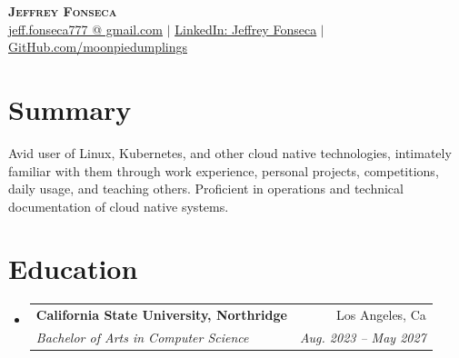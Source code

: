 \documentclass[letterpaper,11pt]{article}
\makeatletter
\newcommand{\resumeSubheading}[4]{
  \vspace{-2pt}\item
    \begin{tabular*}{0.97\textwidth}[t]{l@{\extracolsep{\fill}}r}
      \textbf{#1} & #2 \\
      \textit{\small#3} & \textit{\small #4} \\
    \end{tabular*}\vspace{-7pt}
}
\newcommand{\resumeSubHeadingListStart}{\begin{itemize}[leftmargin=0.15in, label={}]}
\newcommand{\resumeSubHeadingListEnd}{\end{itemize}}
\makeatother
\begin{document}

\begin{center}
    \textbf{\Huge \scshape Jeffrey Fonseca} \\ \vspace{1pt}
    \small \href{mailto:jeff.fonseca777 [at] gmail.com}{\underline{jeff.fonseca777 @ gmail.com}} $|$
    \href{https://www.linkedin.com/in/jeffrey-fonseca-4242521a4/}{\underline{LinkedIn: Jeffrey Fonseca}} $|$
    \href{https://github.com/moonpiedumplings}{\underline{GitHub.com/moonpiedumplings}}
\end{center}

\section{Summary}

\small{Avid user of Linux, Kubernetes, and other cloud native technologies, intimately familiar with them through work experience, personal projects, competitions, daily usage, and teaching others. Proficient in operations and technical documentation of cloud native systems. \vspace{-2pt}}

\section{Education}
  \resumeSubHeadingListStart
    \resumeSubheading
      {California State University, Northridge}{Los Angeles, Ca}
      {Bachelor of Arts in Computer Science}{Aug. 2023 -- May 2027}
  \resumeSubHeadingListEnd


\end{document}
